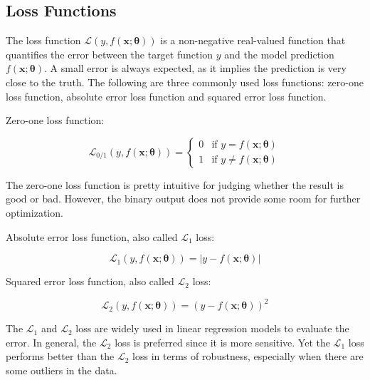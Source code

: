 \documentclass[
	parskip, 			   %
	twoside, 			   %
	DIV=14, 			   %
	BCOR=15.0mm, 		   %
	headsepline, 		   %
	open=right, 		   %
	captions=tableheading, %
	bibliography=totoc,    %
	numbers=noenddot       %
]{scrreprt}
\begin{document}
\subsection{Loss Functions}
The loss function $\mathcal{L}\left( y,f(\mathbf{x};\mathbf{\theta}) \right)$ is a non-negative real-valued function that quantifies the error between the target function $y$ and the model prediction $f(\mathbf{x};\mathbf{\theta})$. A small error is always expected, as it implies the prediction is very close to the truth. The following are three commonly used loss functions: zero-one loss function, absolute error loss function and squared error loss function.

Zero-one loss function:

\begin{equation}
    \label{eq:zero_one_loss}
    \mathcal{L}_{0/1}\left( y,f \left(\mathbf{x};\mathbf{\theta} \right) \right) = \begin{cases} 0 & \text{if } y=f(\mathbf{x};\mathbf{\theta}) \\ 1 & \text{if } y \neq f(\mathbf{x};\mathbf{\theta})
    \end{cases}
\end{equation}

The zero-one loss function is pretty intuitive for judging whether the result is good or bad. However, the binary output does not provide some room for further optimization.

Absolute error loss function, also called $\mathcal{L}_{1}$ loss:

\begin{equation}
    \label{eq:AE_loss}
    \mathcal{L}_{1}\left( y,f(\mathbf{x};\mathbf{\theta}) \right) = |y-f(\mathbf{x};\mathbf{\theta})|
\end{equation}

Squared error loss function, also called $\mathcal{L}_{2}$ loss:

\begin{equation}
    \label{eq:SE_loss}
    \mathcal{L}_{2}\left( y,f(\mathbf{x};\mathbf{\theta}) \right) = (y-f(\mathbf{x};\mathbf{\theta}))^2
\end{equation}

The $\mathcal{L}_{1}$ and $\mathcal{L}_{2}$ loss are widely used in linear regression models to evaluate the error. In general, the $\mathcal{L}_{2}$ loss is preferred since it is more sensitive. Yet the $\mathcal{L}_{1}$ loss performs better than the $\mathcal{L}_{2}$ loss in terms of robustness, especially when there are some outliers in the data.
\end{document}
